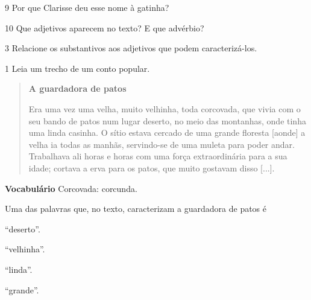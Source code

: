\num{9} Por que Clarisse deu esse nome à gatinha?


\num{10} Que adjetivos aparecem no texto? E que advérbio?


\num{3} Relacione os substantivos aos adjetivos que podem caracterizá-los.

%
%
%
%
%
%
%
%
%
%
%


\num{1} Leia um trecho de um conto popular.

\begin{quote}
\textbf{A guardadora de patos}

Era uma vez uma velha, muito velhinha, toda corcovada, que vivia com o
seu bando de patos num lugar deserto, no meio das montanhas, onde tinha
uma linda casinha. O sítio estava cercado de uma grande floresta [aonde] a
velha ia todas as manhãs, servindo-se de uma muleta para poder andar.
Trabalhava ali horas e horas com uma força extraordinária para a sua
idade; cortava a erva para os patos, que muito gostavam disso
{[}...{]}.

\end{quote}

\textbf{Vocabulário}
Corcovada: corcunda.

Uma das palavras que, no texto, caracterizam a guardadora de patos é

\begin{escolha}
\item ``deserto''.

\item ``velhinha''.

\item ``linda''.

\item ``grande''.
\end{escolha}

